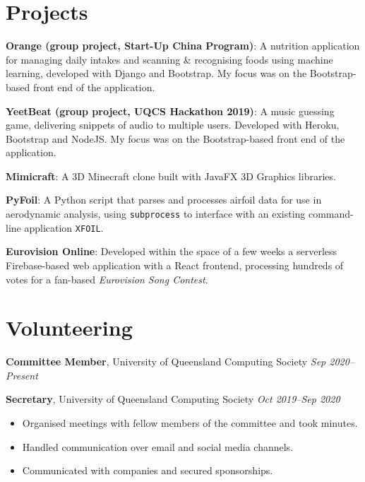 \documentclass[9pt, a4paper]{extarticle}
\begin{document}

\section*{Projects}

\href{https://github.com/summerprogram2019/orange}{\faGithub} \textbf{Orange (group project, Start-Up China Program)}: A nutrition application for managing daily intakes and scanning \& recognising foods using machine learning, developed with Django and Bootstrap. My focus was on the Bootstrap-based front end of the application.

\href{https://github.com/mattchrlw/yeetbeat}{\faGithub} \textbf{YeetBeat (group project, UQCS Hackathon 2019)}: A music guessing game, delivering snippets of audio to multiple users. Developed with Heroku, Bootstrap and NodeJS. My focus was on the Bootstrap-based front end of the application.

\href{https://github.com/mattchrlw/mimicraft}{\faGithub} \textbf{Mimicraft}: A 3D Minecraft clone built with JavaFX 3D Graphics libraries.

\href{https://github.com/mattchrlw/pyfoil}{\faGithub} \textbf{PyFoil}: A Python script that parses and processes airfoil data for use in aerodynamic analysis, using \texttt{subprocess} to interface with an existing command-line application \texttt{XFOIL}.

\textbf{Eurovision Online}: Developed within the space of a few weeks a serverless Firebase-based web application with a React frontend, processing hundreds of votes for a fan-based \textit{Eurovision Song Contest}.

\section*{Volunteering}
\textbf{Committee Member}, University of Queensland Computing Society \hfill \textit{Sep 2020--Present}

\textbf{Secretary}, University of Queensland Computing Society \hfill \textit{Oct 2019--Sep 2020}
\begin{itemize}[label=\textcolor{gray!80}{\textbullet}]
    \item Organised meetings with fellow members of the committee and took minutes.
    \item Handled communication over email and social media channels.
    \item Communicated with companies and secured sponsorships.
\end{itemize}
\end{document}
